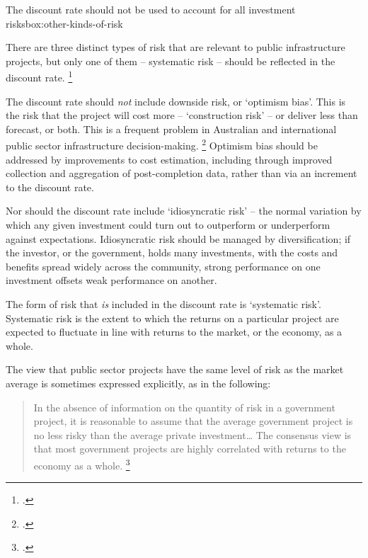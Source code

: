 \documentclass{grattan}
\begin{document}
\begin{smallbox}{The discount rate should not be used to account for all investment risks}{box:other-kinds-of-risk}

There are three distinct types of risk that are relevant to public infrastructure projects, but only one of them -- systematic risk -- should be reflected in the discount rate.%
 \footcite[][7]{BITRE2005RiskinCostBenefitAnalysis}

The discount rate should \emph{not} include downside risk, or `optimism bias'. This is the risk that the project will cost more -- `construction risk' -- or deliver less than forecast, or both. This is a frequent problem in Australian and international public sector infrastructure decision-making.%
    \footcites{Terrill-etal-2016-Cost-overruns-in-transport-infrastructure}{Flyvbjerg2009} 
Optimism bias should be addressed by improvements to cost estimation, including through improved collection and aggregation of post-completion data, rather than via an increment to the discount rate. 

Nor should the discount rate include `idiosyncratic risk' – the normal variation by which any given investment could turn out to outperform or underperform against expectations.  Idiosyncratic risk should be managed by diversification; if the investor, or the government, holds many investments, with the costs and benefits spread widely across the community, strong performance on one investment offsets weak performance on another.

The form of risk that \emph{is} included in the discount rate is `systematic risk'. Systematic risk is the extent to which the returns on a particular project are expected to fluctuate in line with returns to the market, or the economy, as a whole.
   
\end{smallbox}


The view that public sector projects have the same level of risk as the market average is sometimes expressed explicitly, as in the following:
\begin{quote}\small
In the absence of information on the quantity of risk in a government project, it is reasonable to assume that the average government project is no less risky than the average private investment\dots{} The consensus view is that most government projects are highly correlated with returns to the economy as a whole.%
    \footcite[][60]{Harrison-Valuing-the-Future}
\end{quote}
\end{document}
